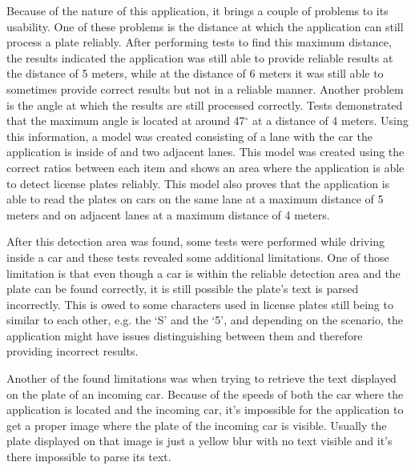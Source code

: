 Because of the nature of this application, it brings a couple of problems to its usability. One of these problems is the distance at which the application can still process a plate reliably. After performing tests to find this maximum distance, the results indicated the application was still able to provide reliable results at the distance of 5 meters, while at the distance of 6 meters it was still able to sometimes provide correct results but not in a reliable manner. Another problem is the angle at which the results are still processed correctly. Tests demonstrated that the maximum angle is located at around 47$^{\circ}$ at a distance of 4 meters. Using this information, a model was created consisting of a lane with the car the application is inside of and two adjacent lanes. This model was created using the correct ratios between each item and shows an area where the application is able to detect license plates reliably. This model also proves that the application is able to read the plates on cars on the same lane at a maximum distance of 5 meters and on adjacent lanes at a maximum distance of 4 meters.

After this detection area was found, some tests were performed while driving inside a car and these tests revealed some additional limitations. One of those limitation is that even though a car is within the reliable detection area and the plate can be found correctly, it is still possible the plate's text is parsed incorrectly. This is owed to some characters used in license plates still being to similar to each other, e.g. the `S' and the `5', and depending on the scenario, the application might have issues distinguishing between them and therefore providing incorrect results.

Another of the found limitations was when trying to retrieve the text displayed on the plate of an incoming car. Because of the speeds of both the car where the application is located and the incoming car, it's impossible for the application to get a proper image where the plate of the incoming car is visible. Usually the plate displayed on that image is just a yellow blur with no text visible and it's there impossible to parse its text.





